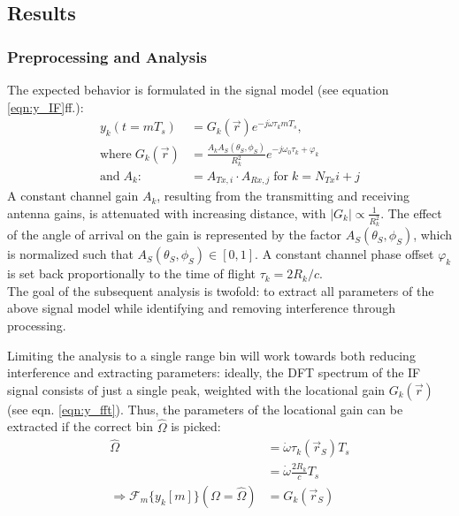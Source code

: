 \subsection{Results}
\subsubsection*{Preprocessing and Analysis}

The expected behavior is formulated in the signal model (see equation \ref{eqn:y_IF}ff.):
\begin{align}
    y_k(t=mT_s)                & =                  G_k(\vec r) e^{-j\dot\omega\tau_k mT_s},                 \\
    \text{where}\; G_k(\vec r) & = \frac{A_kA_S(\theta_S,\phi_S)}{R_{k}^2}  e^{-j\omega_0\tau_k + \varphi_k} \\
    \text{and}\;A_k :          & = A_{Tx,i} \cdot A_{Rx,j} \;\text{for}\;k=N_{Tx}i+j
\end{align}
A constant channel gain $A_k$, resulting from the transmitting and receiving antenna gains,
is attenuated with increasing distance, with $|G_k| \propto \frac{1}{R_{k}^2}$.
The effect of the angle of arrival on the gain is represented by the factor $A_S(\theta_S,\phi_S)$,
which is normalized such that $A_S(\theta_S,\phi_S) \in [0,1]$.
A constant channel phase offset $\varphi_k$ is set back proportionally to the time of flight $\tau_k = 2R_k/c$. \\

The goal of the subsequent analysis is twofold:
to extract all parameters of the above signal model while identifying and removing interference through processing.

Limiting the analysis to a single range bin will work towards both reducing interference and extracting parameters:
ideally, the DFT spectrum of the IF signal consists of just a single peak,
weighted with the locational gain $G_k(\vec r)$ (see eqn. \ref{eqn:y_fft}).
Thus, the parameters of the locational gain can be extracted if the correct bin $\hat \Omega$ is picked:
\begin{align}
    \hat \Omega                                               & = \dot \omega \tau_k(\vec r_S)T_s    \\
                                                              & = \dot \omega \frac{2R_k}{c}T_s      \\
    \Rightarrow \mathcal{F}_m\{y_k[m]\}(\Omega = \hat \Omega) & =    G_k(\vec r_S) \label{eqn:G_fft}
\end{align}

